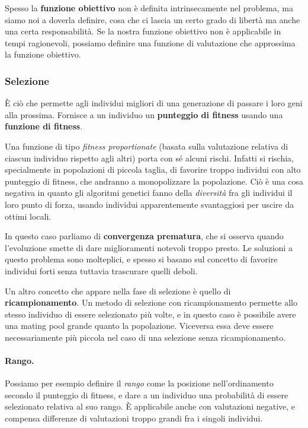                 Spesso la \textbf{funzione obiettivo} non è definita intrinsecamente nel problema, ma siamo noi a doverla definire, cosa che ci lascia un certo grado di libertà ma anche una certa responsabilità. Se la nostra funzione obiettivo non è applicabile in tempi ragionevoli, possiamo definire una funzione di valutazione che approssima la funzione obiettivo.
                
            
            \subsubsection{Selezione}
                È ciò che permette agli individui migliori di una generazione di passare i loro geni alla prossima. Fornisce a un individuo un \textbf{punteggio di fitness} usando una \textbf{funzione di fitness}.
                
                Una funzione di tipo \textit{fitness proportionate} (basata sulla valutazione relativa di ciascun individuo rispetto agli altri) porta con sé alcuni rischi. Infatti si rischia, specialmente in popolazioni di piccola taglia, di favorire troppo individui con alto punteggio di fitness, che andranno a monopolizzare la popolazione. Ciò è una cosa negativa in quanto gli algoritmi genetici fanno della \textit{diversità} fra gli individui il loro punto di forza, usando individui apparentemente svantaggiosi per uscire da ottimi locali.
                
                In questo caso parliamo di \textbf{convergenza prematura}, che si osserva quando l'evoluzione smette di dare miglioramenti notevoli troppo presto. Le soluzioni a questo problema sono molteplici, e spesso si basano sul concetto di favorire individui forti senza tuttavia trascurare quelli deboli.
                
                Un altro concetto che appare nella fase di selezione è quello di \textbf{ricampionamento}. Un metodo di selezione con ricampionamento permette allo stesso individuo di essere selezionato più volte, e in questo caso è possibile avere una mating pool grande quanto la popolazione. Viceversa essa deve essere necessariamente più piccola nel caso di una selezione senza ricampionamento.
                
                \paragraph{Rango.} Possiamo per esempio definire il \textit{rango} come la posizione nell'ordinamento secondo il punteggio di fitness, e dare a un individuo una probabilità di essere selezionato relativa al suo rango. È applicabile anche con valutazioni negative, e compensa differenze di valutazioni troppo grandi fra i singoli individui.
                
